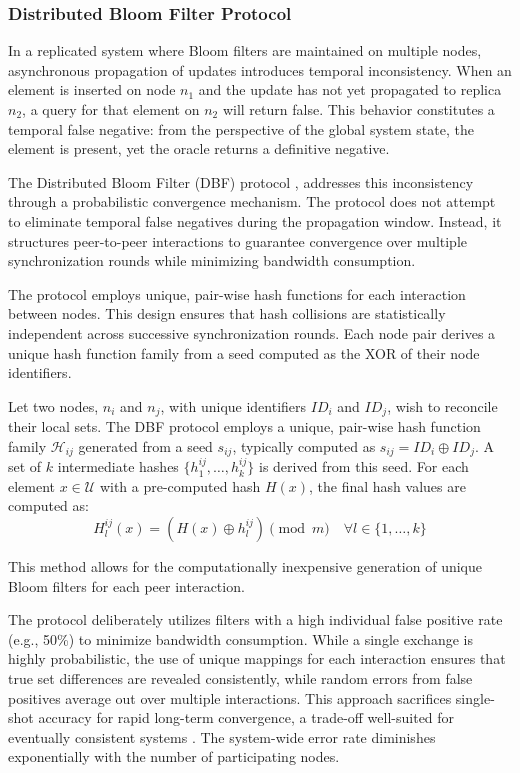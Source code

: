 \subsubsection{Distributed Bloom Filter Protocol}

In a replicated system where Bloom filters are maintained on multiple nodes, asynchronous propagation of updates introduces temporal inconsistency. When an element is inserted on node $n_1$ and the update has not yet propagated to replica $n_2$, a query for that element on $n_2$ will return false. This behavior constitutes a temporal false negative: from the perspective of the global system state, the element is present, yet the oracle returns a definitive negative.

The Distributed Bloom Filter (DBF) protocol \cite{Ramabaja2019TheDB}, addresses this inconsistency through a probabilistic convergence mechanism. The protocol does not attempt to eliminate temporal false negatives during the propagation window. Instead, it structures peer-to-peer interactions to guarantee convergence over multiple synchronization rounds while minimizing bandwidth consumption.

The protocol employs unique, pair-wise hash functions for each interaction between nodes. This design ensures that hash collisions are statistically independent across successive synchronization rounds. Each node pair derives a unique hash function family from a seed computed as the XOR of their node identifiers.

\begin{definition}
    Let two nodes, $n_i$ and $n_j$, with unique identifiers $ID_i$ and $ID_j$, wish to reconcile their local sets. The DBF protocol employs a unique, pair-wise hash function family $\mathcal{H}_{ij}$ generated from a seed $s_{ij}$, typically computed as $s_{ij} = ID_i \oplus ID_j$. A set of $k$ intermediate hashes $\{h_1^{ij}, \ldots, h_k^{ij}\}$ is derived from this seed. For each element $x \in \mathcal{U}$ with a pre-computed hash $H(x)$, the final hash values are computed as:
    \begin{equation*}
        H_l^{ij}(x) = (H(x) \oplus h_l^{ij}) \pmod m \quad \forall l \in \{1, \ldots, k\}
    \end{equation*}
\end{definition}
This method allows for the computationally inexpensive generation of unique Bloom filters for each peer interaction.

The protocol deliberately utilizes filters with a high individual false positive rate (e.g., 50\%) to minimize bandwidth consumption. While a single exchange is highly probabilistic, the use of unique mappings for each interaction ensures that true set differences are revealed consistently, while random errors from false positives average out over multiple interactions. This approach sacrifices single-shot accuracy for rapid long-term convergence, a trade-off well-suited for eventually consistent systems \cite{Ramabaja2019TheDB}. The system-wide error rate diminishes exponentially with the number of participating nodes.

